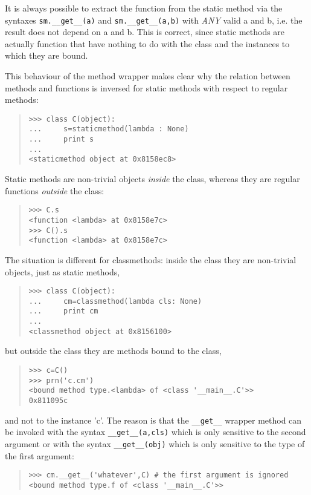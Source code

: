 \documentclass[10pt,english]{article}
\begin{document}
It is always possible to extract the function from the static method
via the syntaxes \texttt{sm.{\_}{\_}get{\_}{\_}(a)} and \texttt{sm.{\_}{\_}get{\_}{\_}(a,b)} with \emph{ANY} valid
a and b, i.e. the result does not depend on a and b. This is correct,
since static methods are actually function that have nothing to do
with the class and the instances to which they are bound.

This behaviour of the method wrapper makes clear why the relation between 
methods and functions is inversed for static methods with respect to
regular methods:
\begin{quote}
\begin{verbatim}>>> class C(object):
...     s=staticmethod(lambda : None)
...     print s
...
<staticmethod object at 0x8158ec8>\end{verbatim}
\end{quote}

Static methods are non-trivial objects \emph{inside} the class, whereas 
they are regular functions \emph{outside} the class:
\begin{quote}
\begin{verbatim}>>> C.s
<function <lambda> at 0x8158e7c>
>>> C().s
<function <lambda> at 0x8158e7c>\end{verbatim}
\end{quote}

The situation is different for classmethods: inside the class they
are non-trivial objects, just as static methods,
\begin{quote}
\begin{verbatim}>>> class C(object):
...     cm=classmethod(lambda cls: None)
...     print cm
...
<classmethod object at 0x8156100>\end{verbatim}
\end{quote}

but outside the class they are methods bound to the class,
\begin{quote}
\begin{verbatim}>>> c=C()
>>> prn('c.cm') 
<bound method type.<lambda> of <class '__main__.C'>> 
0x811095c\end{verbatim}
\end{quote}

and not to the instance 'c'. The reason is that the \texttt{{\_}{\_}get{\_}{\_}} wrapper method
can be invoked with the syntax  \texttt{{\_}{\_}get{\_}{\_}(a,cls)} which 
is only sensitive to the second argument or with the syntax
\texttt{{\_}{\_}get{\_}{\_}(obj)} which is only sensitive to the type of the first
argument:
\begin{quote}
\begin{verbatim}>>> cm.__get__('whatever',C) # the first argument is ignored
<bound method type.f of <class '__main__.C'>>\end{verbatim}
\end{quote}
\end{document}

